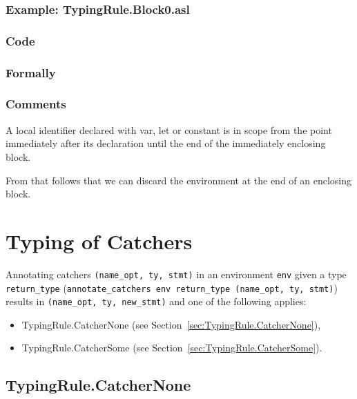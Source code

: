 \documentclass{book}
\begin{document}
  \subsection{Example: TypingRule.Block0.asl}

  \subsection{Code}

  \subsection{Formally}

  \subsection{Comments}
    A local identifier declared with var, let or constant is in scope
from the point immediately after its declaration until the end of the
immediately enclosing block.

    From that follows that we can discard the environment at the end of
an enclosing block.
 

\chapter{Typing of Catchers}
Annotating catchers \texttt{(name\_opt, ty, stmt)} in an environment
\texttt{env} given a type \texttt{return\_type} (\texttt{annotate\_catchers env
return\_type (name\_opt, ty, stmt)}) results in \texttt{(name\_opt, ty,
new\_stmt)} and one of the following applies:
\begin{itemize}
\item TypingRule.CatcherNone (see Section~\ref{sec:TypingRule.CatcherNone}),
\item TypingRule.CatcherSome (see Section~\ref{sec:TypingRule.CatcherSome}).
\end{itemize}
   
\section{TypingRule.CatcherNone \label{sec:TypingRule.CatcherNone}}
\end{document}
